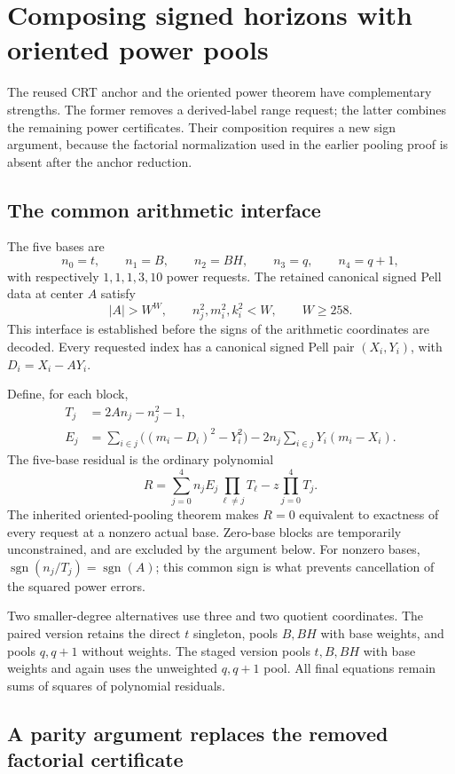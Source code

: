 \section{Composing signed horizons with oriented power pools}

The reused CRT anchor and the oriented power theorem have complementary
strengths. The former removes a derived-label range request; the latter
combines the remaining power certificates. Their composition requires a new
sign argument, because the factorial normalization used in the earlier
pooling proof is absent after the anchor reduction.

\subsection{The common arithmetic interface}

The five bases are
\[
 n_0=t,\qquad n_1=B,\qquad n_2=BH,\qquad n_3=q,\qquad n_4=q+1,
\]
with respectively $1,1,1,3,10$ power requests. The retained canonical signed
Pell data at center $A$ satisfy
\[
 |A|>W^W,\qquad n_j^2,m_i^2,k_i^2<W,\qquad W\ge258.
\]
This interface is established before the signs of the arithmetic coordinates
are decoded. Every requested index has a canonical signed Pell pair
$(X_i,Y_i)$, with $D_i=X_i-AY_i$.

Define, for each block,
\begin{align*}
 T_j&=2An_j-n_j^2-1,\\
 E_j&=\sum_{i\in j}\bigl((m_i-D_i)^2-Y_i^2\bigr)
       -2n_j\sum_{i\in j}Y_i(m_i-X_i).
\end{align*}
The five-base residual is the ordinary polynomial
\[
 R=\sum_{j=0}^4 n_jE_j\prod_{\ell\ne j}T_\ell
       -z\prod_{j=0}^4T_j.
\]
The inherited oriented-pooling theorem makes $R=0$ equivalent to exactness
of every request at a nonzero actual base. Zero-base blocks are temporarily
unconstrained, and are excluded by the argument below. For nonzero bases,
$\operatorname{sgn}(n_j/T_j)=\operatorname{sgn}(A)$; this common sign is what
prevents cancellation of the squared power errors.

Two smaller-degree alternatives use three and two quotient coordinates.
The paired version retains the direct $t$ singleton, pools $B,BH$ with base
weights, and pools $q,q+1$ without weights. The staged version pools
$t,B,BH$ with base weights and again uses the unweighted $q,q+1$ pool.
All final equations remain sums of squares of polynomial residuals.

\subsection{A parity argument replaces the removed factorial certificate}

